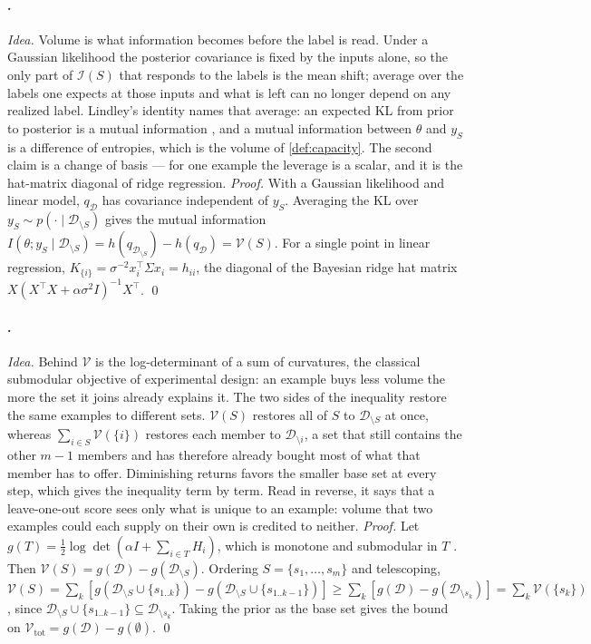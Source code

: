 \documentclass[10pt,twocolumn,letterpaper]{article}
\theoremstyle{definition}
\newcommand{\logdet}{\log\det}
\newcommand{\Vol}{\mathcal{V}}
\newcommand{\Inf}{\mathcal{I}}
\newcommand{\D}{\mathcal{D}}
\newcommand{\DS}{\mathcal{D}_{\setminus S}}
\newcommand{\T}{^{\top}}
\begin{document}
\paragraph{.} \emph{Idea.} Volume is what information becomes before the label is read. Under a Gaussian likelihood the posterior covariance is fixed by the inputs alone, so the only part of $\Inf(S)$ that responds to the labels is the mean shift; average over the labels one expects at those inputs and what is left can no longer depend on any realized label. Lindley's identity names that average: an expected KL from prior to posterior is a mutual information \citep{lindley1956}, and a mutual information between $\theta$ and $y_S$ is a difference of entropies, which is the volume of \cref{def:capacity}. The second claim is a change of basis --- for one example the leverage is a scalar, and it is the hat-matrix diagonal of ridge regression. \emph{Proof.} With a Gaussian likelihood and linear model, $q_\D$ has covariance independent of $y_S$. Averaging the KL over $y_S\sim p(\cdot\mid\DS)$ gives the mutual information $I(\theta;y_S\mid\DS)=h(q_{\DS})-h(q_\D)=\Vol(S)$. For a single point in linear regression, $K_{\{i\}}=\sigma^{-2}x_i\T\Sigma x_i=h_{ii}$, the diagonal of the Bayesian ridge hat matrix $X(X\T X+\alpha\sigma^2I)^{-1}X\T$. \qed

\paragraph{.} \emph{Idea.} Behind $\Vol$ is the log-determinant of a sum of curvatures, the classical submodular objective of experimental design: an example buys less volume the more the set it joins already explains it. The two sides of the inequality restore the same examples to different sets. $\Vol(S)$ restores all of $S$ to $\D_{\setminus S}$ at once, whereas $\sum_{i\in S}\Vol(\{i\})$ restores each member to $\D_{\setminus i}$, a set that still contains the other $m-1$ members and has therefore already bought most of what that member has to offer. Diminishing returns favors the smaller base set at every step, which gives the inequality term by term. Read in reverse, it says that a leave-one-out score sees only what is unique to an example: volume that two examples could each supply on their own is credited to neither. \emph{Proof.} Let $g(T)=\tfrac12\logdet(\alpha I+\sum_{i\in T}H_i)$, which is monotone and submodular in $T$ \citep{krause2008}. Then $\Vol(S)=g(\D)-g(\DS)$. Ordering $S=\{s_1,\dots,s_m\}$ and telescoping, $\Vol(S)=\sum_k[g(\DS\cup\{s_{1..k}\})-g(\DS\cup\{s_{1..k-1}\})]\ge\sum_k[g(\D)-g(\D_{\setminus s_k})]=\sum_k\Vol(\{s_k\})$, since $\DS\cup\{s_{1..k-1}\}\subseteq\D_{\setminus s_k}$. Taking the prior as the base set gives the bound on $\Vol_{\mathrm{tot}}=g(\D)-g(\emptyset)$. \qed
\end{document}
